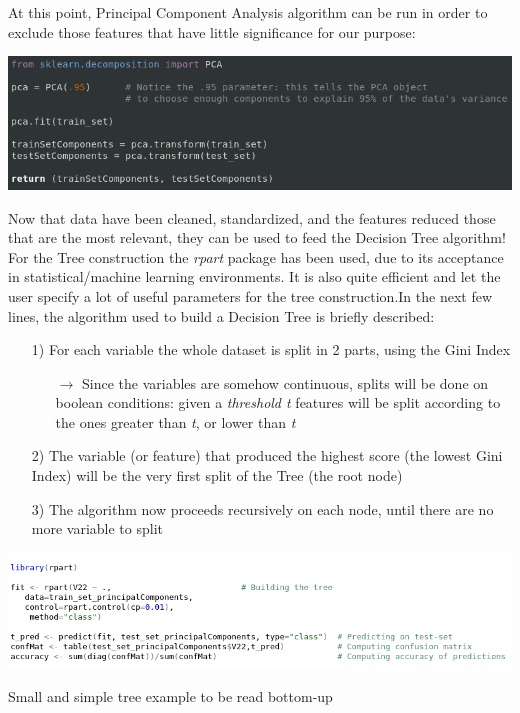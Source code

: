 \vspace{0.5cm}

\begin{minipage}{\linewidth}
At this point, Principal Component Analysis algorithm can be run in order to exclude those features that have little significance for our purpose:\newline\newline

	\centering
	\includegraphics[width=\textwidth]{img/PCA.png}
	
	\vspace{0.5cm}

Now that data have been cleaned, standardized, and the features reduced those that are the most relevant, they can be used to feed the Decision Tree algorithm!\newline\newline
For the Tree construction the \emph{rpart} package has been used, due to its acceptance in statistical/machine learning environments. It is also quite efficient and let the user specify a lot of useful parameters for the tree construction.\newline In the next few lines, the algorithm used to build a Decision Tree is briefly described:

\begin{itemize}
	\item[1)] For each variable the whole dataset is split in 2 parts, using the Gini Index
		\begin{itemize}
			\item[$\rightarrow$] Since the variables are somehow continuous, splits will be done on boolean conditions: given a \emph{threshold t} features will be split according to the ones greater than \emph{t}, or lower than \emph{t}
		\end{itemize}
	\item[2)] The variable (or feature) that produced the highest score (the lowest Gini Index) will be the very first split of the Tree (the root node)
	\item[3)] The algorithm now proceeds recursively on each node, until there are no more variable to split
\end{itemize}

	\includegraphics[width=\textwidth]{img/Rpart.png}
	
\end{minipage}

\vspace{0.5cm}

\begin{minipage}{\linewidth}

	
	Small and simple tree example to be read bottom-up
	
\end{minipage}
	
